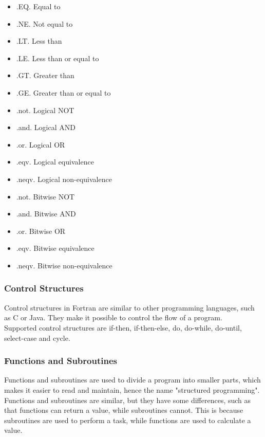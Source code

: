 \documentclass[12pt,a4paper]{scrartcl}
\begin{document}
\begin{itemize}
\item .EQ. Equal to
\item .NE. Not equal to
\item .LT. Less than
\item .LE. Less than or equal to
\item .GT. Greater than
\item .GE. Greater than or equal to
\end{itemize}

\begin{itemize}
\item .not. Logical NOT
\item .and. Logical AND
\item .or. Logical OR
\item .eqv. Logical equivalence
\item .neqv. Logical non-equivalence
\end{itemize}

\begin{itemize}
\item .not. Bitwise NOT
\item .and. Bitwise AND
\item .or. Bitwise OR
\item .eqv. Bitwise equivalence
\item .neqv. Bitwise non-equivalence
\end{itemize}

\subsubsection{Control Structures}
Control structures in Fortran are similar to other programming languages, such as C or Java. They make it possible to control the flow of a program.\\
Supported control structures are if-then, if-then-else, do, do-while, do-until, select-case and cycle.\\


\subsubsection{Functions and Subroutines}
Functions and subroutines are used to divide a program into smaller parts, which makes it easier to read and maintain, hence the name "structured programming".
Functions and subroutines are similar, but they have some differences, such as that functions can return a value, while subroutines cannot. This is because subroutines are used to perform a task, while functions are used to calculate a value.\\
\end{document}
